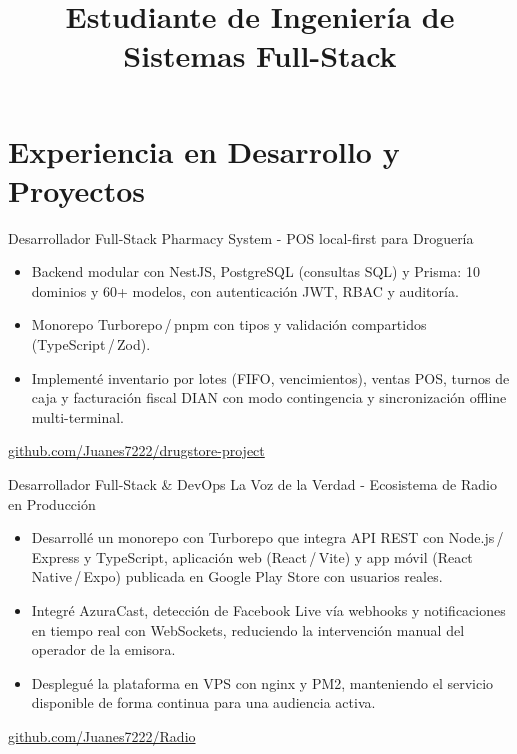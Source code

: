 \documentclass[11pt,a4paper,sans]{moderncv}
\title{Estudiante de Ingeniería de Sistemas \textperiodcentered{} Full-Stack}
\begin{document}
\makecvtitle

\section{Experiencia en Desarrollo y Proyectos}

  {Desarrollador Full-Stack}
  {Pharmacy System - POS local-first para Droguería}
  {}{}
  {\begin{itemize}
     \item Backend modular con NestJS, PostgreSQL (consultas SQL) y Prisma:
           10 dominios y 60+ modelos, con autenticación JWT, RBAC y auditoría.
     \item Monorepo Turborepo\,/\,pnpm con tipos y validación compartidos
           (TypeScript\,/\,Zod).
     \item Implementé inventario por lotes (FIFO, vencimientos), ventas POS,
           turnos de caja y facturación fiscal DIAN con modo contingencia
           y sincronización offline multi-terminal.
   \end{itemize}
   \footnotesize\href{https://github.com/Juanes7222/drugstore-project}{github.com/Juanes7222/drugstore-project}}

  {Desarrollador Full-Stack \& DevOps}
  {La Voz de la Verdad - Ecosistema de Radio en Producción}
  {}{}
  {\begin{itemize}
     \item Desarrollé un monorepo con Turborepo que integra API REST con
           Node.js\,/\,Express y TypeScript, aplicación web (React\,/\,Vite) y app
           móvil (React Native\,/\,Expo) publicada en Google Play Store
           con usuarios reales.
     \item Integré AzuraCast, detección de Facebook Live vía webhooks y
           notificaciones en tiempo real con WebSockets, reduciendo la
           intervención manual del operador de la emisora.
     \item Desplegué la plataforma en VPS con nginx y PM2, manteniendo el
           servicio disponible de forma continua para una audiencia activa.
   \end{itemize}
   \footnotesize\href{https://github.com/Juanes7222/Radio}{github.com/Juanes7222/Radio}}

\end{document}
